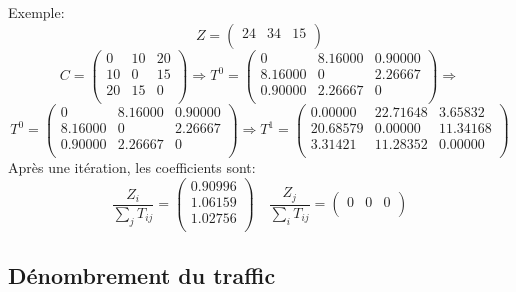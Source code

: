 Exemple:
$$Z = (\begin{array}{ccc}
24  & 34  & 15\\
\end{array})$$
$$
C = \left(\begin{array}{ccc}
0& 10 &20 \\
10& 0 &15 \\
20 & 15& 0 \\
\end{array}\right) \Rightarrow T^0 = \left(\begin{array}{ccc}
       0  & 8.16000  &  0.90000\\
   8.16000  &     0  & 2.26667\\
   0.90000  & 2.26667  &    0\\
\end{array}\right) \Rightarrow$$
$$T^0 = \left(\begin{array}{ccc}
       0  & 8.16000  &  0.90000\\
   8.16000  &     0  & 2.26667\\
   0.90000  & 2.26667  &    0\\
\end{array}\right) \Rightarrow T^1 = \left( \begin{array}{ccc}
    0.00000 &  22.71648 &   3.65832 \\
   20.68579 &   0.00000 &  11.34168 \\
    3.31421 &  11.28352 &   0.00000 \\
\end{array} \right)$$
Après une itération, les coefficients sont:
$$\frac{Z_i}{\sum_j T_{ij}} = \left(\begin{array}{c}
0.90996 \\
1.06159  \\
1.02756\\
\end{array}\right) \quad \frac{Z_j}{\sum_i T_{ij}} = \left(\begin{array}{ccc}
0  & 0 & 0\\
\end{array}\right)$$



\subsection{Dénombrement du traffic}

